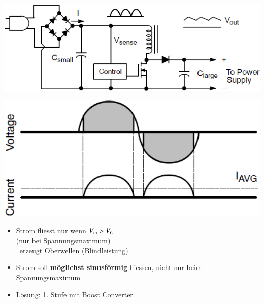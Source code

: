 \begin{minipage}[c]{0.42\columnwidth}
    \includegraphics[width=\columnwidth]{images/pfc_schaltung.png}
\end{minipage}
\hfill
\begin{minipage}[c]{0.42\columnwidth}
    \includegraphics[width=\columnwidth]{images/pfc.png}
\end{minipage}

\begin{minipage}[c]{0.48\columnwidth}
    \begin{center}
    \end{center}
    \begin{itemize}
        \item Strom fliesst nur wenn $V_{\rm in} > V_C$\\
            (nur bei Spannungsmaximum) \\
            \textrightarrow\ erzeugt Oberwellen (Blindleistung)
    \end{itemize}
\end{minipage}
\hfill
\begin{minipage}[c]{0.48\columnwidth}
    \raggedright%
    \begin{center}
    \end{center}
    \begin{itemize}
        \item Strom soll \textbf{möglichst sinusförmig} fliessen, nicht nur beim Spannungsmaximum
        \item Lösung: 1. Stufe mit Boost Converter
    \end{itemize}
\end{minipage}


